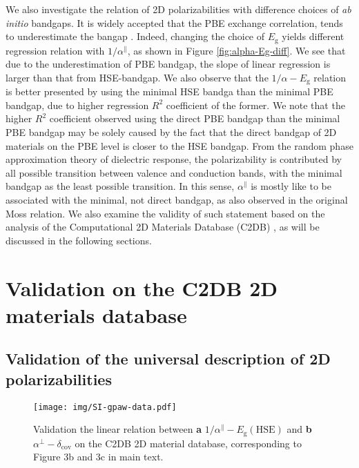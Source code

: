 \documentclass[manuscript=suppinfo,email=true,hyperref=true,keywords=false]{achemso}
\begin{document}
We also investigate the relation of 2D polarizabilities with
difference choices of \textit{ab initio} bandgaps. It is widely
accepted that the PBE exchange correlation, tends to underestimate the
bangap \cite{Heyd_2005,Kumar_2016_PRB,Kumar_2016_jpcc}.  Indeed,
changing the choice of $E_{\mathrm{g}}$ yields different regression
relation with $1/\alpha^{\parallel}$, as shown in Figure
\ref{fig:alpha-Eg-diff}. We see that due to the underestimation of PBE
bandgap, the slope of linear regression is larger than that from
HSE-bandgap. We also observe that the $1/\alpha-E_{\mathrm{g}}$
relation is better presented by using the minimal HSE bandga than the
minimal PBE bandgap, due to higher regression $R^{2}$ coefficient of
the former. We note that the higher $R^{2}$ coefficient observed using
the direct PBE bandgap than the minimal PBE bandgap may be solely
caused by the fact that the direct bandgap of 2D materials on the PBE
level is closer to the HSE bandgap. From the random phase
approximation theory of dielectric response, the polarizability is
contributed by all possible transition between valence and conduction
bands, with the minimal bandgap as the least possible transition. In
this sense, $\alpha^{\parallel}$ is mostly like to be associated with
the minimal, not direct bandgap, as also observed in the original Moss
relation. We also examine the validity of such statement based on the
analysis of the Computational 2D Materials Database (C2DB)
\cite{Haastrup_2018}, as will be discussed in the following sections.








\section{Validation on the C2DB 2D materials database}
\label{sec:gpaw}
\subsection{Validation of the universal description of 2D polarizabilities}
\label{sec:gpaw-1}

\begin{figure}[htbp]
  \centering
  \texttt{[image: img/SI-gpaw-data.pdf]}
  \caption{Validation the linear relation between \textbf{a}
    $1/\alpha^{\parallel}-E_{\mathrm{g}}(\mathrm{HSE})$ and \textbf{b}
    $\alpha^{\perp}-\delta_{\mathrm{cov}}$ on the C2DB 2D material
    database, corresponding to Figure 3b and 3c in main text.}
  \label{fig:gpaw-alpha-relation}
\end{figure}
\end{document}

